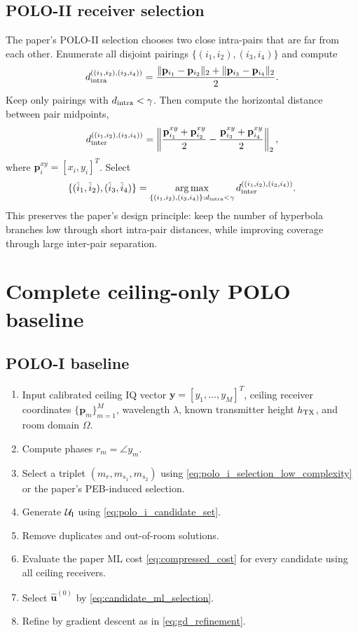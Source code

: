 \documentclass[11pt]{article}
\newcommand{\argmax}{\operatorname*{arg\,max}}
\begin{document}
\subsection{POLO-II receiver selection}

The paper's POLO-II selection chooses two close intra-pairs that are far from each other. Enumerate all disjoint pairings $\{(i_1,i_2),(i_3,i_4)\}$ and compute
\begin{equation}
    d_{\rm intra}^{((i_1,i_2),(i_3,i_4))}
    =\frac{\|\mathbf{p}_{i_1}-\mathbf{p}_{i_2}\|_2+
    \|\mathbf{p}_{i_3}-\mathbf{p}_{i_4}\|_2}{2}.
\end{equation}
Keep only pairings with $d_{\rm intra}<\gamma$. Then compute the horizontal distance between pair midpoints,
\begin{equation}
    d_{\rm inter}^{((i_1,i_2),(i_3,i_4))}
    =\left\|
    \frac{\mathbf{p}^{xy}_{i_1}+\mathbf{p}^{xy}_{i_2}}{2}
    -
    \frac{\mathbf{p}^{xy}_{i_3}+\mathbf{p}^{xy}_{i_4}}{2}
    \right\|_2,
\end{equation}
where $\mathbf{p}^{xy}_i=[x_i,y_i]^T$. Select
\begin{equation}
    \{(\hat i_1,\hat i_2),(\hat i_3,\hat i_4)\}
    =\argmax_{\{(i_1,i_2),(i_3,i_4)\}: d_{\rm intra}<\gamma}
    d_{\rm inter}^{((i_1,i_2),(i_3,i_4))}.
\end{equation}
This preserves the paper's design principle: keep the number of hyperbola branches low through short intra-pair distances, while improving coverage through large inter-pair separation.

\section{Complete ceiling-only POLO baseline}

\subsection*{POLO-I baseline}
\begin{enumerate}[leftmargin=*]
    \item Input calibrated ceiling IQ vector $\mathbf{y}=[y_1,\ldots,y_M]^T$, ceiling receiver coordinates $\{\mathbf{p}_m\}_{m=1}^M$, wavelength $\lambda$, known transmitter height $h_{\rm TX}$, and room domain $\Omega$.
    \item Compute phases $r_m=\angle y_m$.
    \item Select a triplet $(m_r,m_{s_1},m_{s_2})$ using \eqref{eq:polo_i_selection_low_complexity} or the paper's PEB-induced selection.
    \item Generate $\mathcal{U}_{\rm I}$ using \eqref{eq:polo_i_candidate_set}.
    \item Remove duplicates and out-of-room solutions.
    \item Evaluate the paper ML cost \eqref{eq:compressed_cost} for every candidate using all ceiling receivers.
    \item Select $\hat{\mathbf{u}}^{(0)}$ by \eqref{eq:candidate_ml_selection}.
    \item Refine by gradient descent as in \eqref{eq:gd_refinement}.
\end{enumerate}
\end{document}
